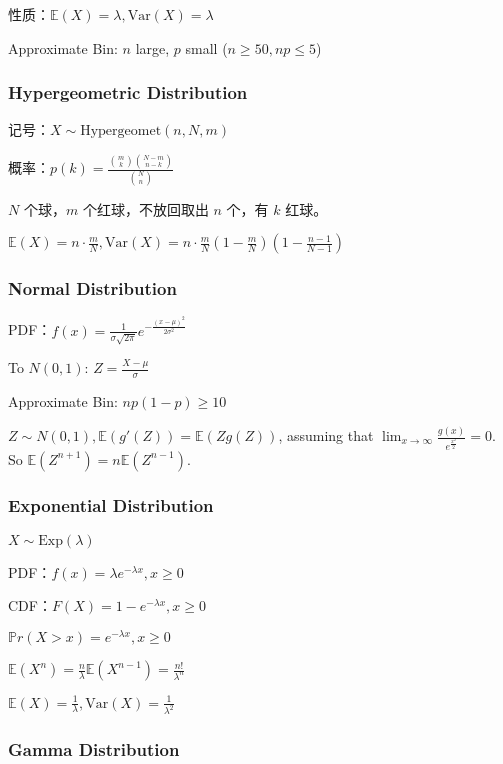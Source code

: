 \documentclass[9pt,landscape]{article}
\begin{document}
\begin{multicols}{3}
性质：$\mathbb{E}(X)=\lambda,\text{Var}(X)=\lambda$

Approximate Bin: $n$ large, $p$ small ($n \ge 50, np \le 5$)

\subsubsection{Hypergeometric Distribution}

记号：$X \sim \text{Hypergeomet}(n, N, m)$

概率：$p(k)=\frac{\binom{m}{k}\binom{N-m}{n-k}}{\binom{N}{n}}$

$N$ 个球，$m$ 个红球，不放回取出 $n$ 个，有 $k$ 红球。

$\mathbb{E}(X)=n\cdot\frac{m}{N}, \mathrm{Var}(X)=n\cdot \frac{m}{N}\left(1-\frac{m}{N}\right)\left(1-\frac{n-1}{N-1}\right)$

\subsubsection{Normal Distribution}

PDF：$f(x)=\frac{1}{\sigma\sqrt{2\pi}}e^{-\frac{\left(x-\mu\right)^2}{2\sigma^2}}$

To $N(0, 1)$: $Z = \frac{X - \mu}{\sigma}$

Approximate Bin: $np(1-p)\ge 10$

$Z\sim N(0, 1), \mathbb{E}(g'(Z))=\mathbb{E}(Zg(Z))$,  assuming that $\lim_{x\to \infty}\frac{g(x)}{e^{\frac{x^2}{2}}}=0$. So $\mathbb{E}(Z^{n+1})=n\mathbb{E}(Z^{n-1})$.

\subsubsection{Exponential Distribution}

$X\sim \mathrm{Exp}(\lambda)$

PDF：$f(x)=\lambda e^{-\lambda x}, x\ge 0$

CDF：$F(X)=1-e^{-\lambda x}, x\ge 0$

$\mathbb{P}r(X>x)=e^{-\lambda x}, x\ge 0$

$\mathbb{E}(X^n)=\frac{n}{\lambda}\mathbb{E}(X^{n-1})=\frac{n!}{\lambda^n}$

$\mathbb{E}(X)=\frac{1}{\lambda}, \mathrm{Var}(X)=\frac{1}{\lambda^2}$

\subsubsection{Gamma Distribution}


\end{multicols}
\end{document}

